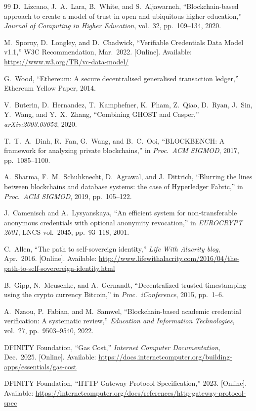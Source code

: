 \documentclass[journal]{IEEEtran}
\begin{document}
\begin{thebibliography}{99}
D.~Lizcano, J.~A.~Lara, B.~White, and S.~Aljawarneh,
``Blockchain-based approach to create a model of trust in open and ubiquitous higher education,''
\textit{Journal of Computing in Higher Education}, vol.~32, pp.~109--134, 2020.

M.~Sporny, D.~Longley, and D.~Chadwick,
``Verifiable Credentials Data Model v1.1,''
W3C Recommendation, Mar.~2022.
[Online]. Available: \url{https://www.w3.org/TR/vc-data-model/}

G.~Wood,
``Ethereum: A secure decentralised generalised transaction ledger,''
Ethereum Yellow Paper, 2014.

V.~Buterin, D.~Hernandez, T.~Kamphefner, K.~Pham, Z.~Qiao, D.~Ryan, J.~Sin, Y.~Wang, and Y.~X.~Zhang,
``Combining GHOST and Casper,''
\textit{arXiv:2003.03052}, 2020.

T.~T.~A.~Dinh, R.~Fan, G.~Wang, and B.~C.~Ooi,
``BLOCKBENCH: A framework for analyzing private blockchains,''
in \textit{Proc.\ ACM SIGMOD}, 2017, pp.~1085--1100.

A.~Sharma, F.~M.~Schuhknecht, D.~Agrawal, and J.~Dittrich,
``Blurring the lines between blockchains and database systems: the case of Hyperledger Fabric,''
in \textit{Proc.\ ACM SIGMOD}, 2019, pp.~105--122.

J.~Camenisch and A.~Lysyanskaya,
``An efficient system for non-transferable anonymous credentials with optional anonymity revocation,''
in \textit{EUROCRYPT 2001}, LNCS vol.~2045, pp.~93--118, 2001.

C.~Allen,
``The path to self-sovereign identity,''
\textit{Life With Alacrity blog}, Apr.~2016.
[Online]. Available: \url{http://www.lifewithalacrity.com/2016/04/the-path-to-self-soverereign-identity.html}

B.~Gipp, N.~Meuschke, and A.~Gernandt,
``Decentralized trusted timestamping using the crypto currency Bitcoin,''
in \textit{Proc.\ iConference}, 2015, pp.~1--6.

A.~Nzaou, P.~Fabian, and M.~Samwel,
``Blockchain-based academic credential verification: A systematic review,''
\textit{Education and Information Technologies}, vol.~27, pp.~9503--9540, 2022.

DFINITY Foundation,
``Gas Cost,'' \textit{Internet Computer Documentation}, Dec.\ 2025.
[Online]. Available: \url{https://docs.internetcomputer.org/building-apps/essentials/gas-cost}

DFINITY Foundation,
``HTTP Gateway Protocol Specification,''
2023.
[Online]. Available: \url{https://internetcomputer.org/docs/references/http-gateway-protocol-spec}

\end{thebibliography}
\end{document}
